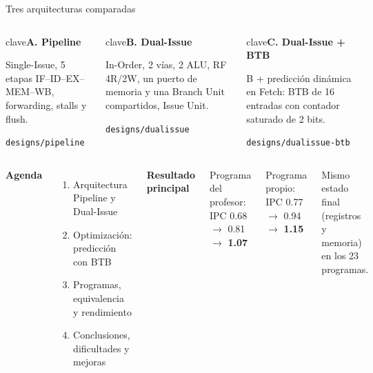 \documentclass[aspectratio=169,10pt]{beamer}
\newcommand{\nota}[1]{{\footnotesize\color{muted}#1}}
\newcommand{\clave}[1]{\begin{beamercolorbox}[rounded=true,sep=6pt]{clave}#1\end{beamercolorbox}}
\begin{document}
\begin{frame}{Tres arquitecturas comparadas}
  \begin{columns}[T]
    \clave{{\color{serA}\textbf{A. Pipeline}}\par\smallskip
      \small Single-Issue, 5 etapas IF--ID--EX--MEM--WB, forwarding, stalls y flush.\par\smallskip
      \nota{\texttt{designs/pipeline}}}
    \clave{{\color{serB}\textbf{B. Dual-Issue}}\par\smallskip
      \small In-Order, 2 vías, 2 ALU, RF 4R/2W, un puerto de memoria y una Branch Unit compartidos, Issue Unit.\par\smallskip
      \nota{\texttt{designs/dualissue}}}
    \clave{{\color{good!70!black}\textbf{C. Dual-Issue + BTB}}\par\smallskip
      \small B + predicción dinámica en Fetch: BTB de 16 entradas con contador saturado de 2 bits.\par\smallskip
      \nota{\texttt{designs/dualissue-btb}}}
  \end{columns}
  \vspace{0.6cm}
  \begin{columns}[T]
    \textbf{Agenda}
    \begin{enumerate}\small
      \item Arquitectura Pipeline y Dual-Issue
      \item Optimización: predicción con BTB
      \item Programas, equivalencia y rendimiento
      \item Conclusiones, dificultades y mejoras
    \end{enumerate}
    \textbf{Resultado principal}\par\smallskip
    \small Programa del profesor: IPC {\color{serA}0.68} $\to$ {\color{serB}0.81} $\to$ \textbf{1.07}\par
    Programa propio: IPC {\color{serA}0.77} $\to$ {\color{serB}0.94} $\to$ \textbf{1.15}\par\smallskip
    \nota{Mismo estado final (registros y memoria) en los 23 programas.}
  \end{columns}
\end{frame}

\end{document}
